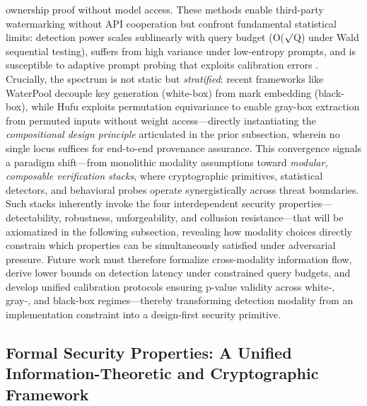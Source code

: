 \documentclass[11pt,a4paper]{article}
\begin{document}
ownership proof without model access. These methods enable third-party watermarking without API cooperation but confront fundamental statistical limits: detection power scales sublinearly with query budget (O($\surd$Q) under Wald sequential testing), suffers from high variance under low-entropy prompts, and is susceptible to adaptive prompt probing that exploits calibration errors \cite{arxiv:2402.16187}. Crucially, the spectrum is not static but \emph{stratified}: recent frameworks like WaterPool \cite{arxiv:2405.13517} decouple key generation (white-box) from mark embedding (black-box), while Hufu \cite{arxiv:1910.12366} exploits permutation equivariance to enable gray-box extraction from permuted inputs without weight access---directly instantiating the \emph{compositional design principle} articulated in the prior subsection, wherein no single locus suffices for end-to-end provenance assurance. This convergence signals a paradigm shift---from monolithic modality assumptions toward \emph{modular, composable verification stacks}, where cryptographic primitives, statistical detectors, and behavioral probes operate synergistically across threat boundaries. Such stacks inherently invoke the four interdependent security properties---detectability, robustness, unforgeability, and collusion resistance---that will be axiomatized in the following subsection, revealing how modality choices directly constrain which properties can be simultaneously satisfied under adversarial pressure. Future work must therefore formalize cross-modality information flow, derive lower bounds on detection latency under constrained query budgets, and develop unified calibration protocols ensuring p-value validity across white-, gray-, and black-box regimes---thereby transforming detection modality from an implementation constraint into a design-first security primitive.


\subsection{Formal Security Properties: A Unified Information-Theoretic and Cryptographic Framework}
\end{document}
